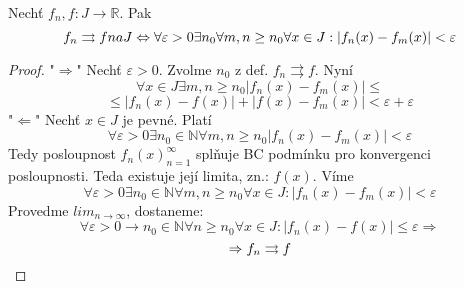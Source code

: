 \begin{vetat}
Nechť $f_n,f : J \rightarrow \mathbb{R}$. Pak
$$f_n \rightrightarrows f na J \Leftrightarrow \forall \varepsilon > 0 \exists n_0 \forall m,n \geq n_0 \forall x \in J : | f_n(x) - f_m(x)| < \varepsilon$$
\end{vetat}
\begin{proof}
"$\Rightarrow$" 
Nechť $\varepsilon > 0.$ Zvolme $n_0$ z def. $f_n \rightrightarrows f.$ 
Nyní $$\forall x \in J \exists m,n \geq n_0 |f_n(x) - f_m(x) | \leq $$ $$\leq |f_n(x) - f(x)| + |f(x) - f_m(x)| < \varepsilon + \varepsilon $$
"$\Leftarrow$"
Nechť $x \in J$ je pevné. Platí $$\forall \varepsilon > 0 \exists n_0 \in \mathbb{N} \forall m,n \geq n_0|f_n(x) - f_m(x)| < \varepsilon$$
Tedy posloupnost ${f_n(x)}_{n=1}^\infty$ splňuje BC podmínku pro konvergenci posloupnosti. Teda existuje její limita, zn.: $f(x)$.
Víme $$\forall \varepsilon > 0 \exists n_0 \in \mathbb{N} \forall m,n \geq n_0 \forall x \in J: |f_n(x)-f_m(x)|<\varepsilon$$
Provedme $lim_{n \to \infty}$, dostaneme:
$$\forall \varepsilon > 0 \rightarrow n_0 \in \mathbb{N} \forall n \geq n_0 \forall x \in J: |f_n(x) - f(x)| \leq \varepsilon \Rightarrow$$
$$\Rightarrow f_n \rightrightarrows f$$
\end{proof}

